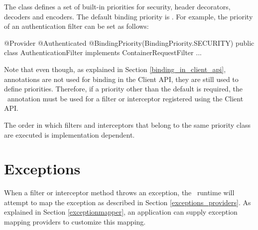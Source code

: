 The  class defines a set of built-in priorities for security, header decorators, decoders and encoders. The default binding priority is . For example, the priority of an authentication filter can be set as follows:

\begin{listing}{1}
@Provider
@Authenticated
@BindingPriority(BindingPriority.SECURITY)
public class AuthenticationFilter implements ContainerRequestFilter {
    ...
}
\end{listing}

Note that even though, as explained in Section \ref{binding_in_client_api}, annotations are not used for binding in the Client API, they are still used to define priorities. Therefore, if a priority other than the default is required, the \BindingPriority\ annotation must be used for a filter or interceptor registered using the Client API. 

The order in which filters and interceptors that belong to the same priority class are executed is implementation dependent.

\section{Exceptions}
\label{exceptions_filters_and_interceptors}

When a filter or interceptor method throws an exception, the \jaxrs\ runtime will attempt to map the exception as described in Section \ref{exceptions_providers}.  As explained in Section \ref{exceptionmapper}, an application can supply exception mapping providers to customize this mapping.
